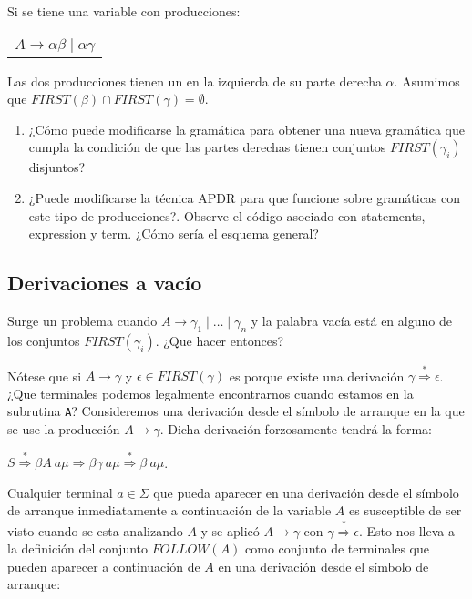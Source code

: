 Si se tiene una variable con producciones:

\begin{tabular}{l}
$A   \rightarrow \alpha \beta \mid \alpha \gamma$
\end{tabular}

Las dos producciones tienen un  en la izquierda
de su parte derecha $\alpha$. Asumimos que $FIRST(\beta) \cap FIRST(\gamma) = \emptyset$.
\begin{enumerate}
\item
¿Cómo puede modificarse la gramática para obtener una nueva gramática que cumpla la condición de que las partes derechas tienen conjuntos $FIRST(\gamma_i)$ disjuntos?
\item
¿Puede modificarse la técnica APDR para que funcione sobre gramáticas con este tipo 
de producciones?. Observe el código asociado con statements, expression  y term.
¿Cómo sería el esquema general?
\end{enumerate}

\subsection{Derivaciones a vacío}
Surge un problema cuando $A \rightarrow \gamma_1 \mid \ldots \mid \gamma_n$
y la palabra vacía está en alguno de los conjuntos
$FIRST(\gamma_i)$. ¿Que hacer entonces? 

Nótese que si $A \rightarrow \gamma$ y $\epsilon \in FIRST(\gamma)$ es porque existe una derivación
$\gamma \stackrel{*}{\Longrightarrow} \epsilon$. ¿Que terminales podemos 
legalmente encontrarnos cuando estamos en la subrutina \verb|A|?
Consideremos una derivación desde el símbolo de arranque en la que se 
use la producción $A \rightarrow \gamma$. Dicha derivación forzosamente
tendrá la forma:

\begin{center}
$S \stackrel{*}{\Longrightarrow} \beta A\ a \mu \Longrightarrow \beta \gamma\ a \mu \stackrel{*}{\Longrightarrow} \beta\ a \mu$.
\end{center}

Cualquier terminal $a \in \Sigma$ que pueda aparecer en una derivación desde 
el símbolo de arranque inmediatamente a continuación  de la variable $A$ 
es susceptible de ser visto
cuando se esta analizando $A$ y se aplicó 
$A \rightarrow \gamma$ con $\gamma \stackrel{*}{\Longrightarrow} \epsilon$.
Esto nos lleva a la definición del conjunto $FOLLOW(A)$ como conjunto
de terminales que pueden aparecer a continuación de $A$ en una derivación 
desde el símbolo de arranque:

